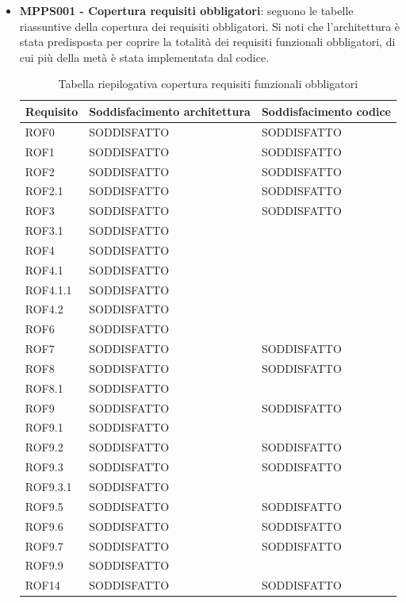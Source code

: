 \documentclass[openany,12pt,a4paper]{report}
\begin{document}
\begin{itemize}
	\item \textbf{MPPS001 - Copertura requisiti obbligatori}: seguono le tabelle riassuntive della copertura dei requisiti obbligatori. Si noti che l'architettura è stata predisposta per coprire la totalità dei requisiti funzionali obbligatori, di cui più della metà è stata implementata dal codice.
	
	\begin{longtable}{|p{40mm}|p{40mm}|p{40mm}|}
		\caption{Tabella riepilogativa copertura requisiti funzionali obbligatori} \\
		\hline
		\centering \textbf{Requisito} & \textbf{Soddisfacimento architettura} &  \textbf{Soddisfacimento codice}\\
		
		\hline \centering ROF0 & SODDISFATTO & SODDISFATTO \\
		\hline \centering ROF1 & SODDISFATTO & SODDISFATTO\\
		\hline \centering ROF2 & SODDISFATTO & SODDISFATTO\\
		\hline \centering ROF2.1 & SODDISFATTO & SODDISFATTO\\
		\hline \centering ROF3 & SODDISFATTO & SODDISFATTO\\
		\hline \centering ROF3.1 & SODDISFATTO & \\
		\hline \centering ROF4 & SODDISFATTO &\\
		\hline \centering ROF4.1 & SODDISFATTO &\\
		\hline \centering ROF4.1.1 & SODDISFATTO &\\
		\hline \centering ROF4.2 & SODDISFATTO &\\
		\hline \centering ROF6 & SODDISFATTO &\\
		\hline \centering ROF7 & SODDISFATTO & SODDISFATTO\\
		\hline \centering ROF8 & SODDISFATTO & SODDISFATTO\\
		\hline \centering ROF8.1 & SODDISFATTO & \\
		\hline \centering ROF9 & SODDISFATTO & SODDISFATTO\\
		\hline \centering ROF9.1 & SODDISFATTO & \\
		\hline \centering ROF9.2 & SODDISFATTO & SODDISFATTO\\
		\hline \centering ROF9.3 & SODDISFATTO & SODDISFATTO\\
		\hline \centering ROF9.3.1 & SODDISFATTO & \\
		\hline \centering ROF9.5 & SODDISFATTO & SODDISFATTO\\
		\hline \centering ROF9.6 & SODDISFATTO & SODDISFATTO\\
		\hline \centering ROF9.7 & SODDISFATTO & SODDISFATTO\\
		\hline \centering ROF9.9 & SODDISFATTO & \\
		\hline \centering ROF14 & SODDISFATTO & SODDISFATTO\\
		\hline
		

\end{longtable}
\end{itemize}
\end{document}
